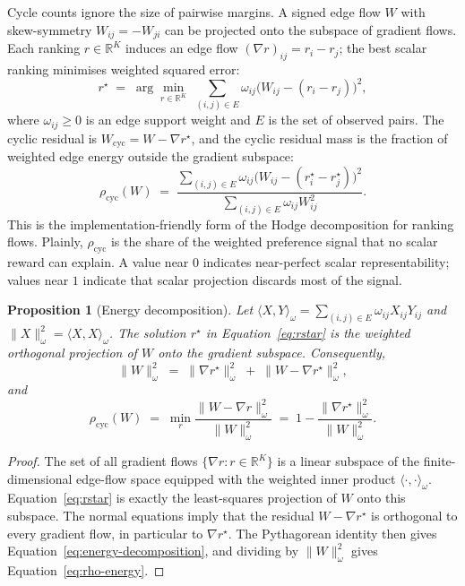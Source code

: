 \documentclass[10pt]{article}
\newtheorem{proposition}[theorem]{Proposition}
\theoremstyle{definition}
\theoremstyle{remark}
\begin{document}
Cycle counts ignore the size of pairwise margins. A signed edge flow $W$ with skew-symmetry $W_{ij} = -W_{ji}$ can be projected onto the subspace of gradient flows. Each ranking $r \in \mathbb{R}^K$ induces an edge flow $(\nabla r)_{ij} = r_i - r_j$; the best scalar ranking minimises weighted squared error:
\begin{equation}
r^\star \;=\; \arg\min_{r \in \mathbb{R}^K}\;\sum_{(i,j)\in E}\omega_{ij}\bigl(W_{ij} - (r_i - r_j)\bigr)^{2},
\label{eq:rstar}
\end{equation}
where $\omega_{ij}\geq 0$ is an edge support weight and $E$ is the set of observed pairs. The cyclic residual is $W_{\mathrm{cyc}} = W - \nabla r^\star$, and the cyclic residual mass is the fraction of weighted edge energy outside the gradient subspace:
\begin{equation}
\rho_{\mathrm{cyc}}(W) \;=\; \frac{\sum_{(i,j)\in E}\omega_{ij}\bigl(W_{ij}-(r^\star_i-r^\star_j)\bigr)^{2}}{\sum_{(i,j)\in E}\omega_{ij}W_{ij}^{2}}.
\label{eq:rho}
\end{equation}
This is the implementation-friendly form of the Hodge decomposition for ranking flows\cite{jiang2011}. Plainly, $\rho_{\mathrm{cyc}}$ is the share of the weighted preference signal that no scalar reward can explain. A value near $0$ indicates near-perfect scalar representability; values near $1$ indicate that scalar projection discards most of the signal.

\begin{proposition}[Energy decomposition]\label{prop:energy}
Let $\langle X,Y\rangle_{\omega}=\sum_{(i,j)\in E}\omega_{ij}X_{ij}Y_{ij}$ and $\|X\|_{\omega}^{2}=\langle X,X\rangle_{\omega}$. The solution $r^\star$ in Equation~\eqref{eq:rstar} is the weighted orthogonal projection of $W$ onto the gradient subspace. Consequently,
\begin{equation}
\|W\|_{\omega}^{2}
\;=\;
\|\nabla r^\star\|_{\omega}^{2}
\;+\;
\|W-\nabla r^\star\|_{\omega}^{2},
\label{eq:energy-decomposition}
\end{equation}
and
\begin{equation}
\rho_{\mathrm{cyc}}(W)
\;=\;
\min_{r}\frac{\|W-\nabla r\|_{\omega}^{2}}{\|W\|_{\omega}^{2}}
\;=\;
1-\frac{\|\nabla r^\star\|_{\omega}^{2}}{\|W\|_{\omega}^{2}} .
\label{eq:rho-energy}
\end{equation}
\end{proposition}
\begin{proof}
The set of all gradient flows $\{\nabla r:r\in\mathbb{R}^{K}\}$ is a linear subspace of the finite-dimensional edge-flow space equipped with the weighted inner product $\langle\cdot,\cdot\rangle_\omega$. Equation~\eqref{eq:rstar} is exactly the least-squares projection of $W$ onto this subspace. The normal equations imply that the residual $W-\nabla r^\star$ is orthogonal to every gradient flow, in particular to $\nabla r^\star$. The Pythagorean identity then gives Equation~\eqref{eq:energy-decomposition}, and dividing by $\|W\|_\omega^2$ gives Equation~\eqref{eq:rho-energy}.
\end{proof}
\end{document}
